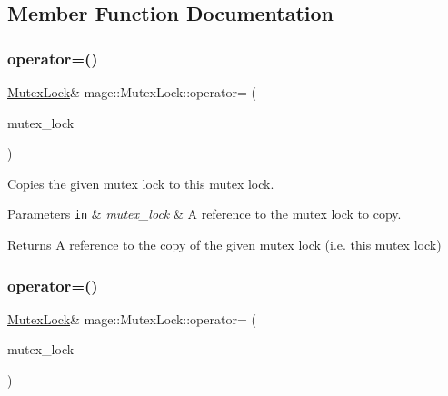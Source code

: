 \subsection{Member Function Documentation}
\hypertarget{structmage_1_1_mutex_lock_a739909161a9a9ca0fc8143ac84967765}{}\label{structmage_1_1_mutex_lock_a739909161a9a9ca0fc8143ac84967765} 
\subsubsection{\texorpdfstring{operator=()}{operator=()}\hspace{0.1cm}{\footnotesize\ttfamily [1/2]}}
{\footnotesize\ttfamily \hyperlink{structmage_1_1_mutex_lock}{Mutex\+Lock}\& mage\+::\+Mutex\+Lock\+::operator= (\begin{DoxyParamCaption}\item[{const \hyperlink{structmage_1_1_mutex_lock}{Mutex\+Lock} \&}]{mutex\+\_\+lock }\end{DoxyParamCaption})\hspace{0.3cm}{\ttfamily [delete]}}

Copies the given mutex lock to this mutex lock.


\begin{DoxyParams}[1]{Parameters}
\mbox{\tt in}  & {\em mutex\+\_\+lock} & A reference to the mutex lock to copy. \\
\hline
\end{DoxyParams}
\begin{DoxyReturn}{Returns}
A reference to the copy of the given mutex lock (i.\+e. this mutex lock) 
\end{DoxyReturn}
\hypertarget{structmage_1_1_mutex_lock_a189a5b4efe2831352b13bd30b80ea47d}{}\label{structmage_1_1_mutex_lock_a189a5b4efe2831352b13bd30b80ea47d} 
\subsubsection{\texorpdfstring{operator=()}{operator=()}\hspace{0.1cm}{\footnotesize\ttfamily [2/2]}}
{\footnotesize\ttfamily \hyperlink{structmage_1_1_mutex_lock}{Mutex\+Lock}\& mage\+::\+Mutex\+Lock\+::operator= (\begin{DoxyParamCaption}\item[{\hyperlink{structmage_1_1_mutex_lock}{Mutex\+Lock} \&\&}]{mutex\+\_\+lock }\end{DoxyParamCaption})\hspace{0.3cm}{\ttfamily [delete]}}

